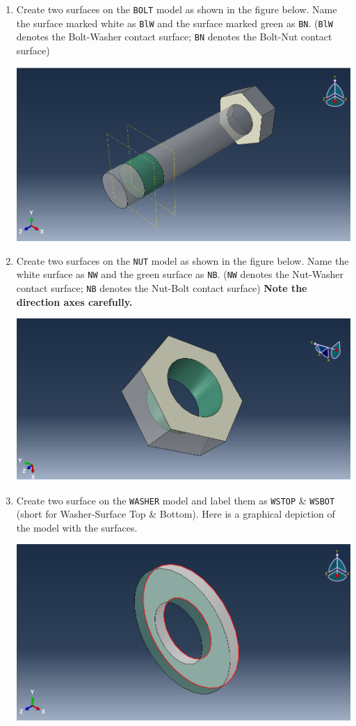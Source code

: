 \documentclass[11pt]{article}
\begin{document}
\begin{enumerate}
\begin{center}
\end{center}
\item Create two surfaces on the \texttt{BOLT} model as shown in the figure below.
Name the surface marked white as \texttt{BlW} and the surface marked green as \texttt{BN}.
(\texttt{BlW} denotes the Bolt-Washer contact surface; \texttt{BN} denotes the Bolt-Nut contact surface)
\begin{center}
\includegraphics[width=.9\linewidth]{./figs/boltsurfs.png}
\end{center}
\item Create two surfaces on the \texttt{NUT} model as shown in the figure below.
Name the white surface as \texttt{NW} and the green surface as \texttt{NB}.
(\texttt{NW} denotes the Nut-Washer contact surface; \texttt{NB} denotes the Nut-Bolt contact surface)
\textbf{Note the direction axes carefully.}
\begin{center}
\includegraphics[width=.9\linewidth]{./figs/nutsurfs.png}
\end{center}
\item Create two surface on the \texttt{WASHER} model and label them as \texttt{WSTOP} \& \texttt{WSBOT} (short for Washer-Surface Top \& Bottom).
Here is a graphical depiction of the model with the surfaces.
\begin{center}
\includegraphics[width=.9\linewidth]{./figs/wshrsurf.png}
\end{center}
\end{enumerate}
\end{document}
